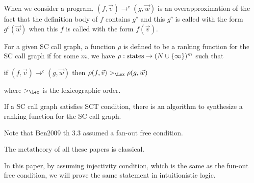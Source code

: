 When we consider a program,
$(f, \Vec v) \to^c (g, \Vec w)$ is an overapproximation of
the fact that
the definition body of $f$ contains $g^c$ and
this $g^c$ is called with the form $g^c(\Vec w)$
when this $f$ is called with the form $f(\Vec v)$.

\begin{Def}\rm
For a given SC call graph,
a function $\rho$ is defined to be a ranking function for the SC call graph if
for some $m$, we have
$\rho: \hbox{states} \to (N \cup \{\infty\})^m$
such that

if $(f, \Vec v) \to^c (g, \Vec w)$
then $\rho(f, \Vec v) >_\Lex \rho(g, \Vec w)$

where $>_\Lex$ is the lexicographic order.
\end{Def}

\begin{Th}
If a SC call graph satisfies SCT condition,
there is an algorithm to synthesize a ranking function
for the SC call graph.
\end{Th}
Note that Ben2009 th 3.3 assumed a fan-out free condition.

The metatheory of all these papers is classical.

In this paper, 
by assuming injectivity condition, which is the same as the fun-out free condition,
we will prove the same statement
in intuitionistic logic.

